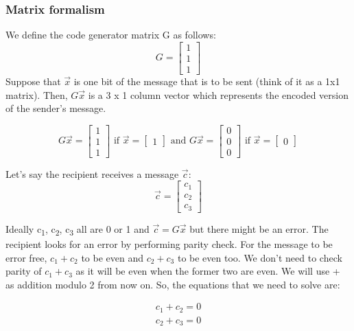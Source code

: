 \documentclass[11pt,a4paper]{article}
\begin{document}
\subsubsection*{Matrix formalism}
We define the code generator matrix G as follows:
$$
    G = \begin{bmatrix}
        1\\1\\1
    \end{bmatrix}
$$
Suppose that $\Vec{x}$ is one bit of the message that is to be sent (think of it as a 1x1 matrix). Then, $G\Vec{x}$ is a 3 x 1 column vector which represents the encoded version of the sender's message. 

$$
G\Vec{x} = 
\begin{bmatrix}
    1\\1\\1
\end{bmatrix}
\text{ if } \Vec{x} =
\begin{bmatrix}
    1
\end{bmatrix}
\text{ and }
G\Vec{x} = 
\begin{bmatrix}
    0\\0\\0
\end{bmatrix}
\text{ if } \Vec{x} =
\begin{bmatrix}
    0
\end{bmatrix}
$$

Let's say the recipient receives a message $\Vec{c}$:
$$
\Vec{c} = 
\begin{bmatrix}
    c_1\\c_2\\c_3
\end{bmatrix}
$$

Ideally c\textsubscript{1}, c\textsubscript{2}, c\textsubscript{3} all are 0 or 1 and $\Vec{c} = G\Vec{x}$ but there might be an error. The recipient looks for an error by performing parity check. For the message to be error free, $c_1 + c_2$ to be even and $c_2 + c_3$ to be even too. We don't need to check parity of $c_1 + c_3$ as it will be even when the former two are even. We will use + as addition modulo 2 from now on. So, the equations that we need to solve are:

\begin{equation}
\begin{aligned}
c_1 + c_2 = 0\\
c_2 + c_3 = 0
\end{aligned}
\label{eq: logical 1}
\end{equation}
\end{document}
